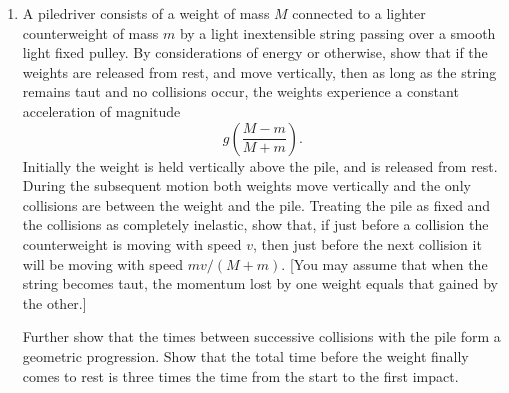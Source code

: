 \documentclass[a4, 11pt]{report}
\newlength{\qspace}
\newcounter{qnumber}
\newenvironment{question}%
 {\vspace{\qspace}
  \begin{enumerate}[\bfseries 1\quad][10]%
    \setcounter{enumi}{\value{qnumber}}%
    \item%
 }
{
  \end{enumerate}
  \filbreak
  \stepcounter{qnumber}
 }
\begin{document}
\begin{question}	
A piledriver consists of a weight of mass $M$ connected to a lighter
counterweight of mass $m$ by a light inextensible string passing
over a smooth light fixed pulley. By considerations of energy or otherwise,
show that if the weights are released from rest, and move vertically,
then as long as the string remains taut and no collisions occur, the
weights experience a constant acceleration of magnitude 
\[
g\left(\frac{M-m}{M+m}\right).
\]
Initially the weight is held vertically above the pile, and is released
from rest. During the subsequent motion both weights move vertically
and the only collisions are between the weight and the pile. Treating
the pile as fixed and the collisions as completely inelastic, show
that, if just before a collision the counterweight is moving with
speed $v$, then just before the next collision it will be moving
with speed $mv/\left(M+m\right)$. {[}You may assume that when the
string becomes taut, the momentum lost by one weight equals that gained
by the other.{]}


Further show that the times between successive collisions with the
pile form a geometric progression. Show that the total time before
the weight finally comes to rest is three times the time from the
start to the first impact. 
\end{question}

\end{document}
